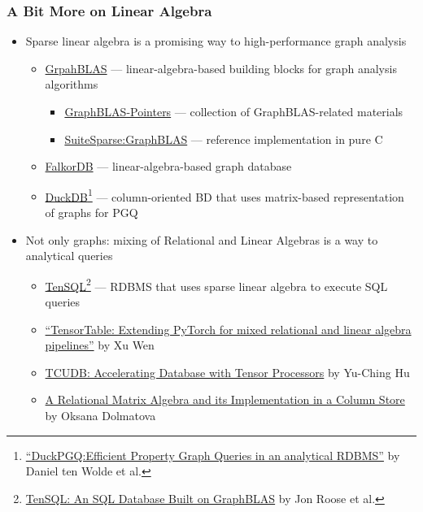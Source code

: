 \documentclass[xcolor=table,aspectratio=169]{beamer}
\begin{document}
\begin{frame}[fragile]
  \frametitle{A Bit More on Linear Algebra}
    \begin{itemize}
    \item Sparse linear algebra is a promising way to high-performance graph analysis
    \begin{itemize}
      \item \href{https://graphblas.org/}{GrpahBLAS}  --- linear-algebra-based building blocks for graph analysis algorithms
      \begin{itemize}
        \item \href{https://github.com/GraphBLAS/GraphBLAS-Pointers}{GraphBLAS-Pointers} --- collection of GraphBLAS-related materials
        \item \href{https://github.com/DrTimothyAldenDavis/GraphBLAS}{SuiteSparse:GraphBLAS} --- reference implementation in pure C
      \end{itemize}
      \item \href{https://github.com/FalkorDB/falkordb}{FalkorDB} --- linear-algebra-based graph database
      \item \href{https://duckdb.org/}{DuckDB}\footnote{\href{https://www.cidrdb.org/cidr2023/papers/p66-wolde.pdf}{``DuckPGQ:Efficient Property Graph Queries in an analytical RDBMS''} by Daniel ten Wolde et al.} --- column-oriented BD that uses matrix-based representation of graphs for PGQ
    \end{itemize}
    \item Not only graphs: mixing of Relational and Linear Algebras is a way to analytical queries
    \begin{itemize}
      \item \href{https://github.com/sandialabs/TenSQL}{TenSQL}\footnote{\href{https://ieeexplore.ieee.org/abstract/document/10363601}{TenSQL: An SQL Database Built on GraphBLAS} by Jon Roose et al.} --- RDBMS that uses sparse linear algebra to execute SQL queries
      \item \href{https://www.sciencedirect.com/science/article/pii/S2772485924000139}{``TensorTable: Extending PyTorch for mixed relational and linear algebra pipelines''} by Xu Wen
      \item \href{https://dl.acm.org/doi/abs/10.1145/3514221.3517869}{TCUDB: Accelerating Database with Tensor Processors} by Yu-Ching Hu %
      \item \href{https://dl.acm.org/doi/abs/10.1145/3318464.3389747}{A Relational Matrix Algebra and its Implementation in a Column Store}  by Oksana Dolmatova %
    \end{itemize}
  \end{itemize}
\end{frame}
\end{document}
